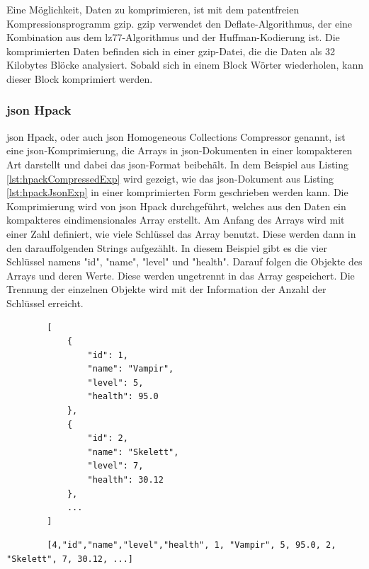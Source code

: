 Eine Möglichkeit, Daten zu komprimieren, ist mit dem patentfreien Kompressionsprogramm \ac{gzip}. \ac{gzip} verwendet den Deflate-Algorithmus, der eine Kombination aus dem \ac{lz77}-Algorithmus und der Huffman-Kodierung ist.\cite{ucdavisExplanationDEFLATE} Die komprimierten Daten befinden sich in einer \ac{gzip}-Datei, die die Daten als 32 Kilobytes Blöcke analysiert. Sobald sich in einem Block Wörter wiederholen, kann dieser Block komprimiert werden. \cite{gnuGzip}\cite{1414952}\cite{seobilityGzipFunktioniert}

\subsubsection{\ac{json} Hpack}
\ac{json} Hpack, oder auch \ac{json} Homogeneous Collections Compressor genannt, ist eine \ac{json}-Komprimierung, die Arrays in \ac{json}-Dokumenten in einer kompakteren Art darstellt und dabei das \ac{json}-Format beibehält. In dem Beispiel aus Listing \ref{lst:hpackCompressedExp} wird gezeigt, wie das \ac{json}-Dokument aus Listing \ref{lst:hpackJsonExp} in einer komprimierten Form geschrieben werden kann. Die Komprimierung wird von \ac{json} Hpack durchgeführt, welches aus den Daten ein kompakteres eindimensionales Array erstellt. Am Anfang des Arrays wird mit einer Zahl definiert, wie viele Schlüssel das Array benutzt. Diese werden dann in den darauffolgenden Strings aufgezählt. In diesem Beispiel gibt es die vier Schlüssel namens "id", "name", "level" und "health". Darauf folgen die Objekte des Arrays und deren Werte. Diese werden ungetrennt in das Array gespeichert. Die Trennung der einzelnen Objekte wird mit der Information der Anzahl der Schlüssel erreicht.\cite{webreflectionLastVersion}

\begin{listing}[htp]
    \begin{verbatim} 
        [
            {
                "id": 1,
                "name": "Vampir",
                "level": 5,
                "health": 95.0
            },
            {
                "id": 2,
                "name": "Skelett",
                "level": 7,
                "health": 30.12
            },
            ...
        ]                   
    \end{verbatim}
    \caption{}
    \label{lst:hpackJsonExp}
\end{listing}

\begin{listing}[htp]
    \begin{verbatim} 
        [4,"id","name","level","health", 1, "Vampir", 5, 95.0, 2, "Skelett", 7, 30.12, ...]                  
    \end{verbatim}
    \caption{}
    \label{lst:hpackCompressedExp}
\end{listing}

